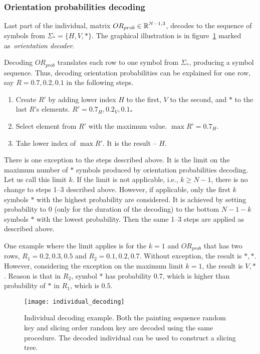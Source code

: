 \subsubsection*{Orientation probabilities decoding}

Last part of the individual, matrix $OR_{prob} \in \operatorname*{\mathbb{R}}^{N-1, 3}$, decodes to the sequence of symbols from $\Sigma_* = \{H, V, *\} $.
The graphical illustration is in figure~\ref{fig:individual-decoding} marked as~\textit{orientation decoder}.

Decoding $OR_{prob}$ translates each row to one symbol from $\Sigma_*$, producing a symbol sequence.
Thus, decoding orientation probabilities can be explained for one row, say $R = 0.7, 0.2, 0.1$
in the following steps.


\begin{enumerate}
    \item Create $R'$ by adding lower index $H$ to the first, $V$ to the second, and $*$ to the last $R$'s elements.
    $R' = 0.7_H, 0.2_V, 0.1_*$
    \item Select element from $R'$ with the maximum value. $\max R' = 0.7_H$.
    \item Take lower index of $\max R'$.
    It is the result – $H$.
\end{enumerate}

There is one exception to the steps described above.
It is the limit on the maximum number of $*$ symbols produced by orientation probabilities decoding.
Let us call this limit $k$.
If the limit is not applicable, i.e., $k \geq N-1$, there is no change to steps 1--3 described above.
However, if applicable, only the first $k$ symbols $*$ with the highest probability are considered.
It is achieved by setting probability to $0$ (only for the duration of the decoding) to the bottom $N-1-k$ symbols $*$ with the lowest probability.
Then the same 1--3 steps are applied as described above.

One example where the limit applies is for the $k=1$ and $OR_{prob}$ that has two rows, $R_1 = 0.2, 0.3, 0.5$ and $R_2 = 0.1, 0.2, 0.7$.
Without exception, the result is $*, *$.
However, considering the exception on the maximum limit $k=1$, the result is $V, *$.
Reason is that in $R_2$, symbol $*$ has probability $0.7$,
which is higher than probability of $*$ in $R_1$, which is $0.5$.

\begin{figure}[h!]
    \texttt{[image: individual\_decoding]}
    \caption{
        Individual decoding example. Both the painting sequence random key and slicing order random key
        are decoded using the same procedure. The decoded individual can be used to construct a slicing tree.
    }
    \label{fig:individual-decoding}
\end{figure}

